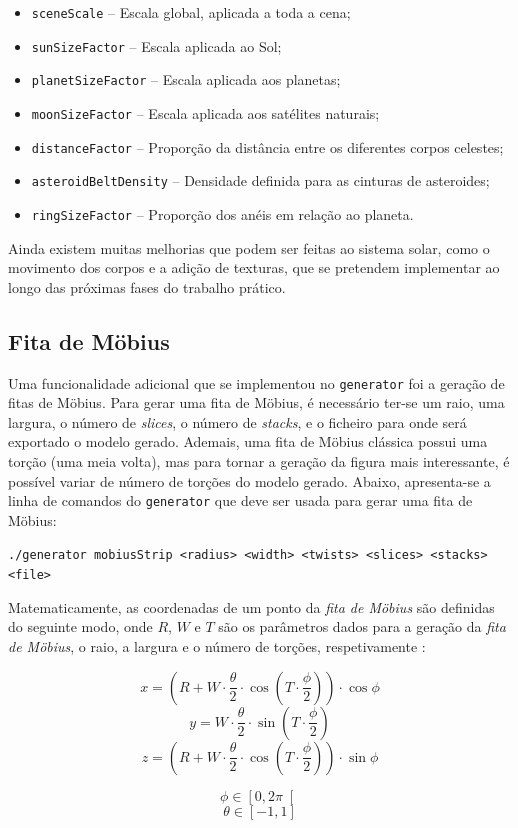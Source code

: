 \documentclass[12pt, a4paper]{article}
\begin{document}
\begin{itemize}
    \item \texttt{sceneScale} -- Escala global, aplicada a toda a cena;
    \item \texttt{sunSizeFactor} -- Escala aplicada ao Sol;
    \item \texttt{planetSizeFactor} -- Escala aplicada aos planetas;
    \item \texttt{moonSizeFactor} -- Escala aplicada aos satélites naturais;
    \item \texttt{distanceFactor} -- Proporção da distância entre os diferentes corpos celestes;
    \item \texttt{asteroidBeltDensity} -- Densidade definida para as cinturas de asteroides;
    \item \texttt{ringSizeFactor} -- Proporção dos anéis em relação ao planeta.
\end{itemize}

Ainda existem muitas melhorias que podem ser feitas ao sistema solar, como o movimento dos corpos e
a adição de texturas, que se pretendem implementar ao longo das próximas fases do trabalho prático.

\subsection{Fita de Möbius}

Uma funcionalidade adicional que se implementou no \texttt{generator} foi a geração de fitas de
Möbius. Para gerar uma fita de Möbius, é necessário ter-se um raio, uma largura, o número de
\emph{slices}, o número de \emph{stacks}, e o ficheiro para onde será exportado o modelo gerado.
Ademais, uma fita de Möbius clássica possui uma torção (uma meia volta), mas para tornar a geração
da figura mais interessante, é possível variar de número de torções do modelo gerado. Abaixo,
apresenta-se a linha de comandos do \texttt{generator} que deve ser usada para gerar uma fita de
Möbius:

\texttt{./generator mobiusStrip <radius> <width> <twists> <slices> <stacks> <file>}

Matematicamente, as coordenadas de um ponto da \emph{fita de Möbius} são definidas do seguinte modo,
onde $R$, $W$ e $T$ são os parâmetros dados para a geração da \emph{fita de Möbius}, o raio, a
largura e o número de torções, respetivamente \cite{mobius-strip}:

\begin{minipage}{0.5\textwidth}
    $$
    x = \left (
            R + W \cdot \frac{\theta}{2} \cdot \cos \left ( T \cdot \frac{\phi}{2} \right )
        \right )
        \cdot \cos \phi
    $$
    $$
    y = W \cdot \frac{\theta}{2} \cdot \sin \left ( T \cdot \frac{\phi}{2} \right )
    $$
    $$
    z = \left (
            R + W \cdot \frac{\theta}{2} \cdot \cos \left ( T \cdot \frac{\phi}{2} \right )
        \right ) \cdot
        \sin \phi
    $$
\end{minipage}
\begin{minipage}{0.5\textwidth}
    $$\phi \in \left [ 0, 2 \pi \right [$$
    $$\theta \in \left [ -1, 1 \right ]$$
\end{minipage}
\end{document}
